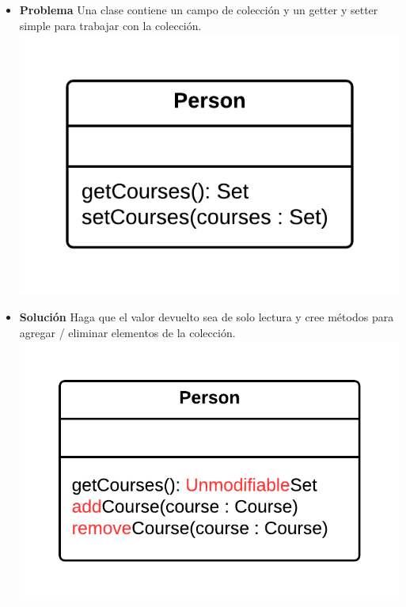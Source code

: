 \documentclass[11pt,a4paper,oneside]{book}
\begin{document}
\begin{itemize}
    \item \textbf{Problema} Una clase contiene un campo de colección y un getter y setter simple para trabajar con la colección.\\
    \centering \includegraphics[scale=0.2]{encapsulatecollectionproblem}
    \item \textbf{Solución} Haga que el valor devuelto sea de solo lectura y cree métodos para agregar / eliminar elementos de la colección.\\
    \centering \includegraphics[scale=0.2]{encapsulatecollectionsolution}
\end{itemize}
    
\end{document}

